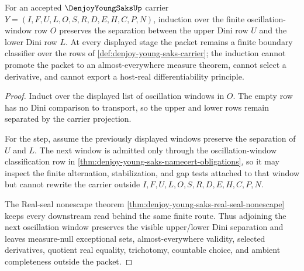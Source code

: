 \begin{theorem}\label{thm:denjoy-young-saks-oscillation-window-induction}
For an accepted $\DenjoyYoungSaksUp$ carrier $Y=(I,F,U,L,O,S,R,D,E,H,C,P,N)$, induction over the finite oscillation-window row $O$ preserves the separation between the upper Dini row $U$ and the lower Dini row $L$. At every displayed stage the packet remains a finite boundary classifier over the rows of \autoref{def:denjoy-young-saks-carrier}; the induction cannot promote the packet to an almost-everywhere measure theorem, cannot select a derivative, and cannot export a host-real differentiability principle.
\end{theorem}
\begin{proof}
Induct over the displayed list of oscillation windows in $O$. The empty row has no Dini comparison to transport, so the upper and lower rows remain separated by the carrier projection.

For the step, assume the previously displayed windows preserve the separation of $U$ and $L$. The next window is admitted only through the oscillation-window classification row in \autoref{thm:denjoy-young-saks-namecert-obligations}, so it may inspect the finite alternation, stabilization, and gap tests attached to that window but cannot rewrite the carrier outside $I,F,U,L,O,S,R,D,E,H,C,P,N$.

The Real-seal nonescape theorem \autoref{thm:denjoy-young-saks-real-seal-nonescape} keeps every downstream read behind the same finite route. Thus adjoining the next oscillation window preserves the visible upper/lower Dini separation and leaves measure-null exceptional sets, almost-everywhere validity, selected derivatives, quotient real equality, trichotomy, countable choice, and ambient completeness outside the packet.
\end{proof}



